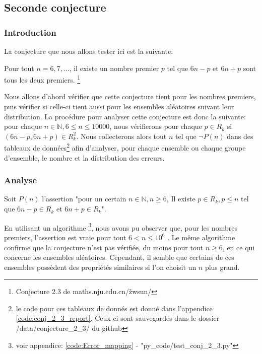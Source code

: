 \documentclass[../main.text]{report}
\begin{document}
\subsection{Seconde conjecture}
\subsubsection{Introduction}

La conjecture que nous allons tester ici est la suivante: 

	\begin{Conj}
	Pour tout $n = 6, 7, ...$, il existe un nombre premier $p$ tel que $6n-p$ et $6n+p$ sont tous les deux premiers. \footnote{Conjecture 2.3 de maths.nju.edu.cn/\~zwsun/}
	\end{Conj}
	

Nous allons d'abord vérifier que cette conjecture tient pour les nombres premiers, puis vérifier si celle-ci tient aussi pour les ensembles aléatoires suivant leur distribution.
La procédure pour analyser cette conjecture est donc la suivante: pour chaque $n\in \mathbb{N}, 6 \leq n \leq 10000$, nous vérifierons pour chaque $p \in R_k$ si $(6n-p,6n+p) \in R_k^2$. Nous collecterons alors tout $n$ tel que $\neg P(n)$ dans des tableaux de données\footnote{le code pour ces tableaux de donnés est donné dans l'appendice \ref{code:conj_2_3_report}. Ceux-ci sont sauvegardés dans le dossier /data/conjecture\_2\_3/ du github} afin d'analyser, pour chaque ensemble ou chaque groupe d'ensemble, le nombre et la distribution des erreurs.

\subsubsection{Analyse}


Soit $P(n)$ l'assertion "pour un certain $n \in \mathbb{N}, n\geq6$, Il existe $p \in R_{k}, p \leq n$ tel que $6n-p \in R_k$ et $6n+p \in R_k$".

En utilisant un algorithme \footnote{voir appendice: \ref{code:Error_mapping} - "py\_code/test\_conj\_2\_3.py" }, nous avons pu observer que, pour les nombres premiers, l'assertion est vraie pour tout $6 < n \leq 10^6$ .
Le même algorithme confirme que la conjecture n'est pas vérifiée, du moins pour tout $n \geq 6$, en ce qui concerne les ensembles aléatoires. Cependant, il semble que certains de ces ensembles possèdent des propriétés similaires si l'on choisit un $n$ plus grand.
\end{document}
